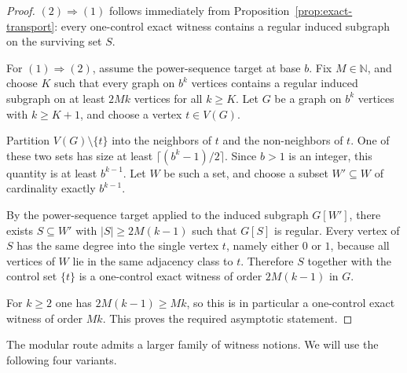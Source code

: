 \documentclass[11pt]{amsart}
\theoremstyle{definition}
\newcommand{\N}{\mathbb{N}}
\begin{document}
\begin{proof}
$(2)\Rightarrow(1)$ follows immediately from Proposition~\ref{prop:exact-transport}: every
one-control exact witness contains a regular induced subgraph on the surviving set $S$.

For $(1)\Rightarrow(2)$, assume the power-sequence target at base $b$. Fix $M \in \N$, and choose
$K$ such that every graph on $b^k$ vertices contains a regular induced subgraph on at least
$2Mk$ vertices for all $k \ge K$. Let $G$ be a graph on $b^k$ vertices with $k \ge K+1$, and
choose a vertex $t \in V(G)$.

Partition $V(G)\setminus\{t\}$ into the neighbors of $t$ and the non-neighbors of $t$. One of these
two sets has size at least $\lceil (b^k-1)/2 \rceil$. Since $b>1$ is an integer, this quantity is at
least $b^{k-1}$. Let $W$ be such a set, and choose a subset $W' \subseteq W$ of cardinality exactly
$b^{k-1}$.

By the power-sequence target applied to the induced subgraph $G[W']$, there exists $S \subseteq W'$
with $|S| \ge 2M(k-1)$ such that $G[S]$ is regular. Every vertex of $S$ has the same degree into the
single vertex $t$, namely either $0$ or $1$, because all vertices of $W$ lie in the same adjacency
class to $t$. Therefore $S$ together with the control set $\{t\}$ is a one-control exact witness of
order $2M(k-1)$ in $G$.

For $k \ge 2$ one has $2M(k-1)\ge Mk$, so this is in particular a one-control exact witness of order
$Mk$. This proves the required asymptotic statement.
\end{proof}

The modular route admits a larger family of witness notions. We will use the following four
variants.
\end{document}
